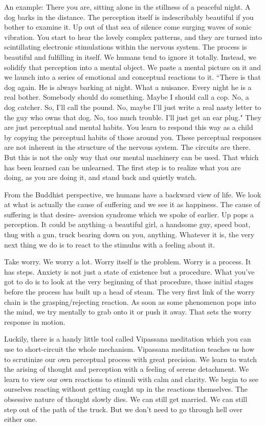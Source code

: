 An example: There you are, sitting alone in the stillness of a peaceful night. A
dog barks in the distance. The perception itself is indescribably beautiful if
you bother to examine it. Up out of that sea of silence come surging waves of
sonic vibration. You start to hear the lovely complex patterns, and they are
turned into scintillating electronic stimulations within the nervous system. The
process is beautiful and fulfilling in itself. We humans tend to ignore it
totally. Instead, we solidify that perception into a mental object. We paste a
mental picture on it and we launch into a series of emotional and conceptual
reactions to it. ``There is that dog again. He is always barking at night. What a
nuisance. Every night he is a real bother. Somebody should do something. Maybe I
should call a cop. No, a dog catcher. So, I'll call the pound. No, maybe I'll
just write a real nasty letter to the guy who owns that dog. No, too much
trouble. I'll just get an ear plug." They are just perceptual and mental habits.
You learn to respond this way as a child by copying the perceptual habits of
those around you. These perceptual responses are not inherent in the structure
of the nervous system. The circuits are there. But this is not the only way that
our mental machinery can be used. That which has been learned can be unlearned.
The first step is to realize what you are doing, as you are doing it, and stand
back and quietly watch.

From the Buddhist perspective, we humans have a backward view of life. We look
at what is actually the cause of suffering and we see it as happiness. The cause
of suffering is that desire- aversion syndrome which we spoke of earlier. Up
pops a perception. It could be anything--a beautiful girl, a handsome guy, speed
boat, thug with a gun, truck bearing down on you, anything. Whatever it is, the
very next thing we do is to react to the stimulus with a feeling about it.

Take worry. We worry a lot. Worry itself is the problem. Worry is a process. It
has steps. Anxiety is not just a state of existence but a procedure. What you've
got to do is to look at the very beginning of that procedure, those initial
stages before the process has built up a head of steam. The very first link of
the worry chain is the grasping/rejecting reaction. As soon as some phenomenon
pops into the mind, we try mentally to grab onto it or push it away. That sets
the worry response in motion.

Luckily, there is a handy little tool called Vipassana meditation which you can
use to short-circuit the whole mechanism.  Vipassana meditation teaches us how
to scrutinize our own perceptual process with great precision. We learn to watch
the arising of thought and perception with a feeling of serene detachment. We
learn to view our own reactions to stimuli with calm and clarity. We begin to
see ourselves reacting without getting caught up in the reactions themselves.
The obsessive nature of thought slowly dies. We can still get married. We can
still step out of the path of the truck. But we don't need to go through hell
over either one.

